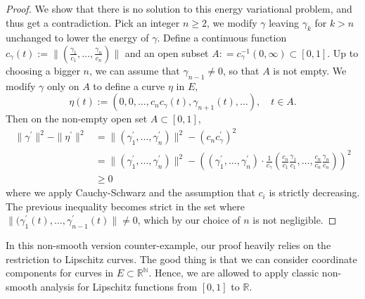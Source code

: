 \begin{proof}
	We show that there is no solution to this energy variational problem,
	and thus get a contradiction.
	Pick an integer $n \geq 2$,
	we modify $\gamma$ leaving $\gamma_k$ for $ k > n$ unchanged to lower the energy of $\gamma$.
	Define a continuous function
	$ c_{\gamma}(t) := \|(\frac{\gamma_1}{c_1}, \ldots, \frac{\gamma_n}{c_n} )\|$
	and an open subset $A: = c_\gamma^{-1}(0, \infty) \subset [0,1]$.
	Up to choosing a bigger $n$,
	we can assume that $ \gamma_{n-1} \neq 0$, so that $A$ is not empty.
	We modify $\gamma$ only on $A$ to define a curve $\eta$ in $E$,
	\[
		\eta(t) := (0,0,\ldots, c_n c_{\gamma}(t),\gamma_{n+1}(t),\ldots),\quad t \in A.
	\]
	Then on the non-empty open set $A \subset [0,1]$,
	\begin{align*}
		\| \gamma^\prime \|^2 - \| \eta^\prime \|^2 & =
		\|( \gamma_1^\prime,\ldots, \gamma_n^\prime )\|^2- (c_n c_\gamma^\prime)^2                         \\
		                                            & = \|( \gamma_1^\prime,\ldots, \gamma_n^\prime )\|^2-
		((\gamma_1^\prime, \ldots, \gamma_n^\prime) \cdot \frac{1}{c_\gamma}
		(\frac{c_n}{c_1} \frac{\gamma_1}{c_1}, \ldots, \frac{c_n}{c_n} \frac{\gamma_n}{c_n}))^2            \\
		                                            & \geq 0
	\end{align*}
	where we apply Cauchy-Schwarz and the assumption that $c_i$ is strictly decreasing.
	The previous inequality becomes strict in the set where $\| (\gamma_1^\prime(t), \ldots, \gamma_{n-1}^\prime(t)\| \ne 0$,
	which by our choice of $n$ is not negligible.
\end{proof}

\begin{rmk}
	In this non-smooth version counter-example, our proof heavily relies on the
	restriction to Lipschitz curves.
	The good thing is that we can consider coordinate components for curves in $E \subset \mathbb{R}^\mathbb{N}$.
	Hence, we are allowed to apply classic non-smooth analysis for Lipschitz functions from $[0,1]$ to $\mathbb{R}$.
\end{rmk}
